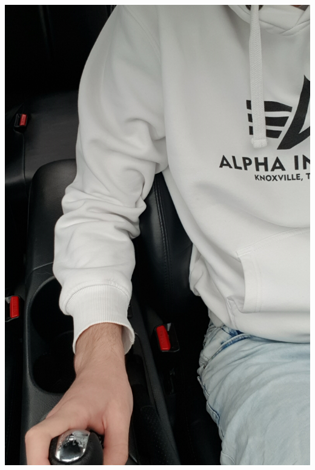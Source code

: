 \documentclass{article}
\begin{document}
\begin{center}
    \includegraphics[scale=0.07]{Celica1.jpg}

\end{center}
\end{document}
